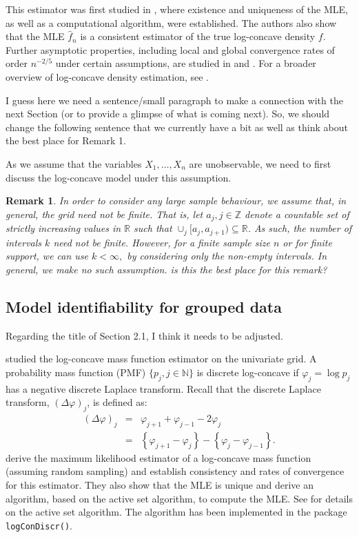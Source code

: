 \documentclass[12pt]{article} %
\newtheorem{remark}[theorem]{Remark}
\newcommand{\comC}[1]{{\noindent  \color{orange}#1}}
\newcommand{\RR}{\mathbb {R}}
\begin{document}
This estimator was first studied in \citet{dumbgen2009logcondens}, where existence and uniqueness of the MLE, as well as a computational algorithm, were established. The authors also show that the MLE $\widehat f_n$ is a consistent estimator of the true log-concave density $f$. Further asymptotic properties, including local and global convergence rates of order $n^{-2/5}$ under certain assumptions, are studied in \citet{brwlogcondens} and \citet{doss1}. For a broader overview of log-concave density estimation, see \citet{revsam, revwalt}.


\comC{I guess here we need a sentence/small paragraph to make a connection with the next Section (or to provide a glimpse of what is coming next). So, we should change the following sentence that we currently have a bit as well as think about the best place for Remark 1.} 

As we assume that the variables $X_1, \ldots, X_n$ are unobservable, we need to first discuss the log-concave model under this assumption.

\begin{remark}\label{rem:grid}
In order to consider any large sample behaviour, we assume that, in general, the grid need not be finite.  That is, let $a_j, j\in \mathbb Z$ denote a countable set of strictly increasing values in $\RR$ such that $\cup_j [a_j, a_{j+1}) \subseteq \RR$.  As such, the number of intervals $k$ need not be finite.  However, for a finite sample size $n$ or for finite support, we can use $k<\infty,$ by considering only the non-empty intervals.   In general, we make no such assumption. \comC{is this the best place for this remark?}
\end{remark}

\subsection{Model identifiability for grouped data }

\comC{Regarding the title of Section 2.1, I think it needs to be adjusted.}

\citet{JankowskiDiscr2013} studied the log-concave mass function estimator on the univariate grid.   A probability mass function (PMF) $\{p_j, j \in \mathbb N\}$ is discrete log-concave if $\varphi_j = \log p_j$ has a negative discrete Laplace transform.   Recall that the discrete Laplace transform, $(\Delta \varphi)_j$, is defined as:
\begin{eqnarray*}
(\Delta \varphi)_j &=& \varphi_{j+1}+\varphi_{j-1}-2\varphi_j\\
&=& \left\{\varphi_{j+1}-\varphi_j\right\}-\left\{\varphi_j-\varphi_{j-1}\right\}.
\end{eqnarray*}
\citet{JankowskiDiscr2013} derive the maximum likelihood estimator of a log-concave mass function (assuming random sampling) and establish consistency and rates of convergence for this estimator. They also show that the MLE is unique and derive an algorithm, based on the active set algorithm, to compute the MLE. See \citet{activeset} for details on the active set algorithm. The algorithm has been implemented in the package \texttt{logConDiscr()}. 
\end{document}
